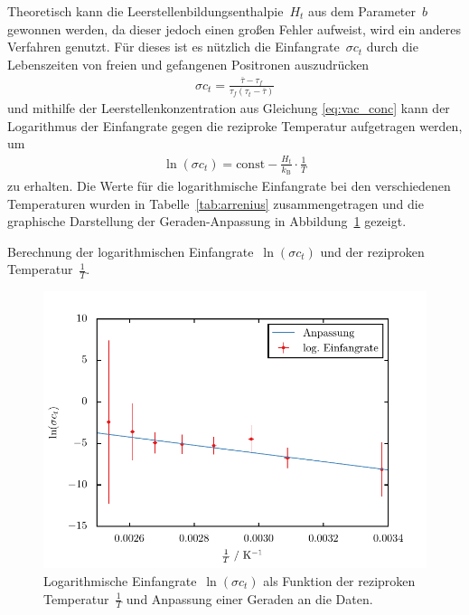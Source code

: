 \documentclass[11pt, a4paper]{article}
\numberwithin{equation}{section}
\begin{document}
Theoretisch kann die Leerstellenbildungsenthalpie~$H_t$ aus dem Parameter~$b$ gewonnen werden, da dieser jedoch einen großen Fehler aufweist, wird ein anderes Verfahren genutzt.
Für dieses ist es nützlich die Einfangrate~$\sigma c_t$ durch die Lebenszeiten von freien und gefangenen Positronen auszudrücken \cite{add_infos}
\begin{align*}
	\sigma c_t = \frac{\bar{\tau} - \tau_f}{\tau_f (\tau_t - \bar{\tau})}
\end{align*}
und mithilfe der Leerstellenkonzentration aus Gleichung \eqref{eq:vac_conc} kann der Logarithmus der Einfangrate gegen die reziproke Temperatur aufgetragen werden, um
\begin{align}
	\ln(\sigma c_t) = \mathrm{const} - \frac{H_t}{k_\mathrm{B}} \cdot \frac{1}{T} \label{eq:logogogogo}
\end{align}
zu erhalten.
Die Werte für die logarithmische Einfangrate bei den verschiedenen Temperaturen wurden in Tabelle~\ref{tab:arrenius} zusammengetragen und die graphische Darstellung der Geraden-Anpassung in Abbildung~\ref{fig:arrenius} gezeigt.
\begin{table}[h]
	\centering
	
	\caption{Berechnung der logarithmischen Einfangrate~$\ln(\sigma c_t)$ und der reziproken Temperatur~$\frac{1}{T}$.}
	\label{tab:arrenius}
\end{table}
\begin{figure}[h]
	\centering
	\includegraphics{./figures/arrenius.pdf}
	\caption{Logarithmische Einfangrate~$\ln(\sigma c_t)$ als Funktion der reziproken Temperatur~$\frac{1}{T}$ und Anpassung einer Geraden an die Daten.}
	\label{fig:arrenius}
\end{figure}
\end{document}
